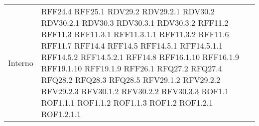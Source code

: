 \begin{longtable}{p{2.5cm}!{\VRule[1pt]}p{2.5cm}}
	Interno & RFF24.4 \newline RFF25.1 \newline RDV29.2 \newline RDV29.2.1 \newline RDV30.2 \newline RDV30.2.1 \newline RDV30.3 \newline RDV30.3.1 \newline RDV30.3.2 \newline RFF11.2 \newline RFF11.3 \newline RFF11.3.1 \newline RFF11.3.1.1 \newline RFF11.3.2 \newline RFF11.6 \newline RFF11.7 \newline RFF14.4 \newline RFF14.5 \newline RFF14.5.1 \newline RFF14.5.1.1 \newline RFF14.5.2 \newline RFF14.5.2.1 \newline RFF14.8 \newline RFF16.1.10 \newline RFF16.1.9 \newline RFF19.1.10 \newline RFF19.1.9 \newline RFF26.1 \newline RFQ27.2 \newline RFQ27.4 \newline RFQ28.2 \newline RFQ28.3 \newline RFQ28.5 \newline RFV29.1.2 \newline RFV29.2.2 \newline RFV29.2.3 \newline RFV30.1.2 \newline RFV30.2.2 \newline RFV30.3.3 \newline ROF1.1 \newline ROF1.1.1 \newline ROF1.1.2 \newline ROF1.1.3 \newline ROF1.2 \newline ROF1.2.1 \newline ROF1.2.1.1 \\

\end{longtable}
